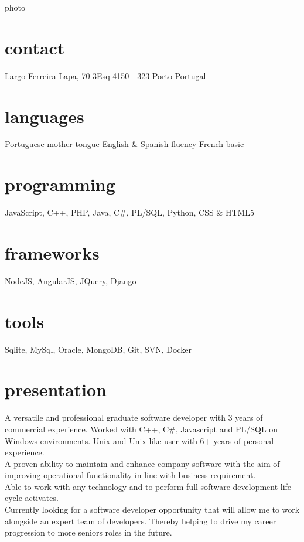 \documentclass[]{friggeri-cv} %
\begin{document}


\begin{aside}{photo} %
\section{contact}
Largo Ferreira Lapa, 70 3Esq
4150 - 323 Porto
Portugal
~
~
\section{languages}
Portuguese mother tongue
English \& Spanish fluency
French basic
\section{programming}
JavaScript,
C++, PHP, Java,
C\#, PL/SQL, Python,
CSS \& HTML5
\section{frameworks}
NodeJS, AngularJS,
JQuery, Django
\section{tools}
Sqlite, MySql,
Oracle, MongoDB,
Git, SVN,
Docker
\end{aside}


\section{presentation}
A versatile and professional graduate software developer with 3 years of commercial experience. Worked with C++, C\#, Javascript and PL/SQL on Windows environments. Unix and Unix-like user with 6+ years of personal experience. \\
A proven ability to maintain and enhance company software with the aim of improving operational functionality in line with business requirement. \\
Able to work with any technology and to perform full software development life cycle activates.\\
Currently looking for a software developer opportunity that will allow me to work alongside an expert team of developers. Thereby helping to drive my career progression to more seniors roles in the future.
\end{document}
